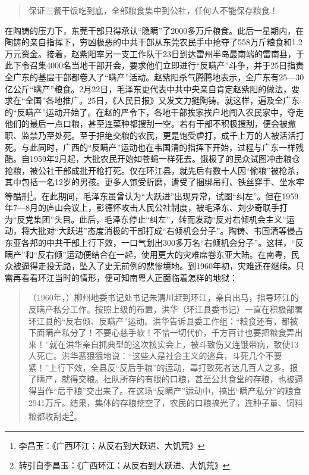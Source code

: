 \begin{quote}

保证三餐干饭吃到底，全部粮食集中到公社，任何人不能保存粮食！

\end{quote}

在陶铸的压力下，东莞干部只得承认“隐瞒”了2000多万斤粮食。此后一星期内，在陶铸的亲自指挥下，穷凶极恶的中共干部从东莞农民手中抢夺了558万斤粮食和1.2万元资金。接着，赵紫阳率另一支工作队于23日到达雷州半岛最南端的雷南县，于此下令召集4000名当地干部开会，要求他们立即进行“反瞒产”斗争，并于25日指责全广东的基层干部都卷入了“瞒产”活动。赵紫阳杀气腾腾地表示，全广东有25—30亿公斤“瞒产”粮食。2月22日，毛泽东更代表中共中央亲自肯定赵紫阳的做法，要求在“全国”各地推广。25日，《人民日报》又发文力挺陶铸。就这样，遍及全广东的“反瞒产”运动开始了。在赵的严令下，各地干部挨家挨户地闯入农民家中，夺走他们的最后一点口粮，甚至连菜种都搜刮一空。若有干部不积极搜刮，便会被撤职、监禁乃至处死。至于拒绝交粮的农民，更是饱受虐打，成千上万的人被活活打死。与此同时，广西的“反瞒产”运动也在韦国清的指挥下开始，过程与广东一样残酷。自1959年2月起，大批农民开始如苍蝇一样死去。饿极了的民众试图冲击粮仓抢粮，被公社干部成批开枪打死。仅在环江县，就先后有数十人因“偷粮”被枪杀，其中包括一名12岁的男孩。更多人饱受折磨，遭受了捆绑吊打、铁丝穿手、坐水牢等酷刑\footnote{李昌玉：《广西环江：从反右到大跃进、大饥荒》}。在此期间，毛泽东虽曾认为“大跃进”出现异常，试图“纠左”。但在1959年7—8月的庐山会议上，彭德怀攻击人民公社制度，被毛泽东、刘少奇联手打为“反党集团”头目。此后，毛泽东停止“纠左”，转而发动“反对右倾机会主义”运动，将大批对“大跃进”态度消极的干部打成“右倾机会分子”。陶铸、韦国清等侵占东亚各邦的中共干部上行下效，一口气划出300多万名“右倾机会分子”。这样，“反瞒产”和“反右倾”运动便结合在一起，使用更大的灾难席卷东亚大陆。在南粤，民众被逼得走投无路，坠入了史无前例的悲惨境地。到1960年初，灾难还在继续。只需再看看环江当时的情形，便可知南粤人正面临着怎样的地狱：

\begin{quote}

（1960年，）柳州地委书记处书记朱渭川赶到环江，亲自出马，指导环江的反瞒产私分工作。按照上级的布置，洪华（环江县委书记）一直在积极部署环江县的“反右倾、反瞒产”运动。洪华告诉县委工作组：“粮食还有，都被下面瞒产私分了！不要心慈手软！不惜一切代价，千方百计也要把粮食弄出来！”就在洪华亲自抓典型的这次核实会上，被斗致伤又连饿带病，致使13人死亡。洪华恶狠狠地说：“这些人是社会主义的逃兵，斗死几个不要紧！”上行下效，全县反“反后手粮”的运动，毒打致死者达几百人之多。报了瞒产，就得交粮。社队所存的有限的口粮，甚至公共食堂的存粮，也被逼得当作“后手粮”交出来了。在这场“反瞒产”运动中，搞出“瞒产私分”的粮食2941万斤。结果，集体的存粮挖空了，农民的口粮搞光了，连种子量、饲料粮都收刮走\footnote{转引自李昌玉：《广西环江：从反右到大跃进、大饥荒》}。

\end{quote}

